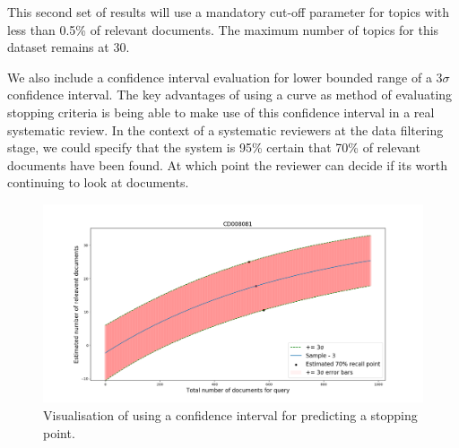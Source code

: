 This second set of results will use a mandatory cut-off parameter for topics with less than 0.5\% of relevant documents.  The maximum number of topics for this dataset remains at 30.

We also include a confidence interval evaluation for lower bounded range of a $3\sigma$ confidence interval. The key advantages of using a curve as  method of evaluating stopping criteria is being able to make use of this confidence interval in a real systematic review. In the context of a systematic reviewers at the data filtering stage, we could specify that the system is 95\% certain that 70\% of relevant documents have been found. At which point the reviewer can decide if its worth continuing to look at documents.

\begin{figure}[H]
\center
\includegraphics[width=13cm]{figures/cf_example.png}
\caption{Visualisation of using a confidence interval for predicting a stopping point.}
\end{figure}



\begin{table}[H]
\caption{Comparison of different of sample method using curve fitting for different CLEF 2017 runs. lower = lower-bound confidence interval. Sample size = 3. Results are taken as averages over all topics for search method. with 0.5\% cut-off}

\end{table}

